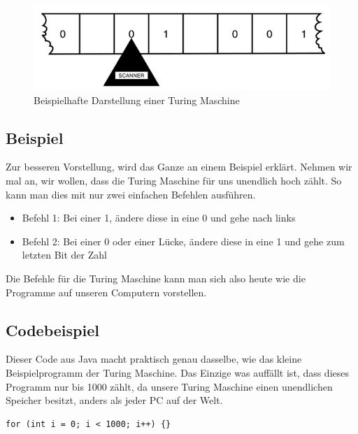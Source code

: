 \begin{figure}[hbtp]
	\centering
	\includegraphics[scale=1]{TuringmashinePicture.png}
	\caption{Beispielhafte Darstellung einer Turing Maschine\cite{theessentialturing}}
\end{figure}

\subsection{Beispiel}
Zur besseren Vorstellung, wird das Ganze an einem Beispiel erklärt. Nehmen wir mal an, wir wollen, dass die Turing Maschine für uns unendlich hoch zählt. So kann man dies mit nur zwei einfachen Befehlen ausführen.

\begin{itemize}
	\item Befehl 1: Bei einer 1, ändere diese in eine 0 und gehe nach links
	\item Befehl 2: Bei einer 0 oder einer Lücke, ändere diese in eine 1 und gehe zum letzten Bit der Zahl
\end{itemize}

Die Befehle für die Turing Maschine kann man sich also heute wie die Programme auf unseren Computern vorstellen.

\subsection{Codebeispiel}
Dieser Code aus Java macht praktisch genau dasselbe, wie das kleine Beispielprogramm der Turing Maschine. Das Einzige was auffällt ist, dass dieses Programm nur bis 1000 zählt, da unsere Turing Maschine einen unendlichen Speicher besitzt, anders als jeder PC auf der Welt.

\begin{verbatim}
for (int i = 0; i < 1000; i++) {}
\end{verbatim}
